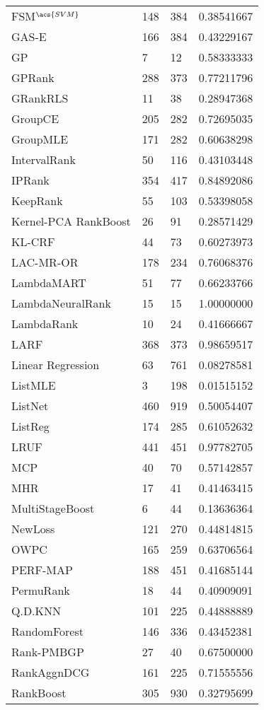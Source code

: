 \begin{longtable}{l|l|l|l}
FSM$^{\acs{SVM}}$ & 148 & 384 & 0.38541667 \\ 
GAS-E & 166 & 384 & 0.43229167 \\ 
GP & 7 & 12 & 0.58333333 \\ 
GPRank & 288 & 373 & 0.77211796 \\ 
GRankRLS & 11 & 38 & 0.28947368 \\ 
GroupCE & 205 & 282 & 0.72695035 \\ 
GroupMLE & 171 & 282 & 0.60638298 \\ 
IntervalRank & 50 & 116 & 0.43103448 \\ 
IPRank & 354 & 417 & 0.84892086 \\ 
KeepRank & 55 & 103 & 0.53398058 \\ 
Kernel-PCA RankBoost & 26 &  91 & 0.28571429 \\ 
KL-CRF &  44 & 73 & 0.60273973 \\ 
LAC-MR-OR & 178 & 234  & 0.76068376 \\ 
LambdaMART & 51 & 77 & 0.66233766 \\ 
LambdaNeuralRank & 15 & 15 & 1.00000000 \\ 
LambdaRank & 10 & 24 & 0.41666667 \\ 
LARF & 368 & 373 & 0.98659517 \\ 
Linear Regression & 63 & 761  & 0.08278581 \\ 
ListMLE & 3 & 198 & 0.01515152 \\ 
ListNet & 460 & 919 & 0.50054407 \\ 
ListReg & 174 & 285 & 0.61052632 \\ 
LRUF & 441 & 451 & 0.97782705 \\ 
MCP & 40 & 70 & 0.57142857 \\ 
MHR & 17 & 41 & 0.41463415 \\ 
MultiStageBoost & 6  & 44 & 0.13636364 \\ 
NewLoss & 121 & 270 & 0.44814815 \\ 
OWPC & 165 & 259 & 0.63706564 \\ 
PERF-\acs{MAP} & 188 & 451 & 0.41685144 \\ 
PermuRank & 18 & 44 & 0.40909091 \\ 
Q.D.\acs{KNN} & 101 & 225 & 0.44888889 \\ 
RandomForest & 146 & 336 & 0.43452381 \\ 
Rank-PMBGP & 27 & 40 & 0.67500000 \\ 
RankAgg\acs{nDCG} & 161 & 225 & 0.71555556 \\ 
RankBoost & 305 & 930 & 0.32795699 \\ 

\end{longtable}
